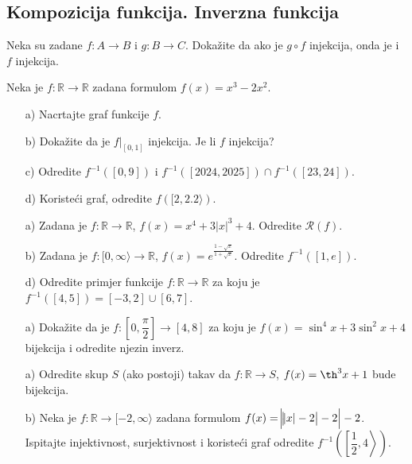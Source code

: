 \subsection*{Kompozicija funkcija. Inverzna funkcija}
\begin{exercise}
Neka su zadane $f : A\to B$ i $g : B\to C$. Dokažite da ako je $g\circ f$ injekcija, onda je i $f$ injekcija.
\end{exercise}
\begin{exercise}
Neka je $f : \mathbb{R} \to \mathbb{R}$ zadana formulom $f(x)=x^3-2x^2$.
\begin{itemize}
\item[a)] Nacrtajte graf funkcije $f$.
\item[b)] Dokažite da je $f|_{[0, 1]}$ injekcija. Je li $f$ injekcija?
\item[c)] Odredite $f^{-1}\left([0, 9]\right)$ i $f^{-1}\left([2024, 2025]\right)\cap f^{-1}\left([23, 24]\right)$.
\item[d)] Koristeći graf, odredite $f\left([2, 2.2\rangle\right)$.
\end{itemize}
\end{exercise}
\begin{exercise} \textbf{}
\begin{itemize}
\item[a)] Zadana je $f : \mathbb{R}\to \mathbb{R}$, $f(x)=x^4+3|x|^3+4$. Odredite $\mathcal{R}(f)$.
\item[b)] Zadana je $f : [0, \infty\rangle\to \mathbb{R}$, $f(x)=e^{\frac{1-\sqrt{x}}{1+\sqrt{x}}}$. Odredite $f^{-1}\left([1, e]\right)$.
\item[d)] Odredite primjer funkcije $f : \mathbb{R}\to \mathbb{R}$ za koju je $f^{-1}\left([4, 5]\right)=[-3, 2]\cup [6, 7]$.
\end{itemize}
\end{exercise}
\begin{exercise} \textbf{}
\begin{itemize}
\item[a)] Dokažite da je $f : \left[0, \dfrac{\pi}{2}\right]\to [4, 8]$ za koju je $f(x)=\sin^4{x}+3\sin^2{x}+4$ bijekcija i odredite njezin inverz.
\item[a)] Odredite skup $S$ (ako postoji) takav da $f : \mathbb{R}\to S$, $f(x)=\th^3{x}+1$ bude bijekcija.
\item[b)] Neka je $f : \mathbb{R}\to [-2, \infty\rangle$ zadana formulom $f(x)=\abs{\abs{\abs{x}-2}-2}-2$. 
Ispitajte injektivnost, surjektivnost i koristeći graf odredite $f^{-1}\left(\left[\dfrac{1}{2}, 4\right\rangle\right)$.
\end{itemize}
\end{exercise}
